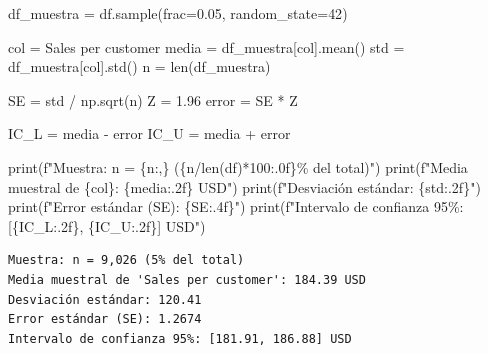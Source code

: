 \documentclass[
  letterpaper,
  DIV=11,
  numbers=noendperiod]{scrartcl}
\newenvironment{Shaded}{\begin{snugshade}}{\end{snugshade}}
\newcommand{\BuiltInTok}[1]{\textcolor[rgb]{0.00,0.23,0.31}{#1}}
\newcommand{\DecValTok}[1]{\textcolor[rgb]{0.68,0.00,0.00}{#1}}
\newcommand{\FloatTok}[1]{\textcolor[rgb]{0.68,0.00,0.00}{#1}}
\newcommand{\NormalTok}[1]{\textcolor[rgb]{0.00,0.23,0.31}{#1}}
\newcommand{\OperatorTok}[1]{\textcolor[rgb]{0.37,0.37,0.37}{#1}}
\newcommand{\SpecialCharTok}[1]{\textcolor[rgb]{0.37,0.37,0.37}{#1}}
\newcommand{\SpecialStringTok}[1]{\textcolor[rgb]{0.13,0.47,0.30}{#1}}
\newcommand{\StringTok}[1]{\textcolor[rgb]{0.13,0.47,0.30}{#1}}
\begin{document}
\protect{}\label{sampling-ci}
\begin{Shaded}
\begin{Highlighting}[]
\NormalTok{df\_muestra }\OperatorTok{=}\NormalTok{ df.sample(frac}\OperatorTok{=}\FloatTok{0.05}\NormalTok{, random\_state}\OperatorTok{=}\DecValTok{42}\NormalTok{)}

\NormalTok{col }\OperatorTok{=} \StringTok{\textquotesingle{}Sales per customer\textquotesingle{}}
\NormalTok{media }\OperatorTok{=}\NormalTok{ df\_muestra[col].mean()}
\NormalTok{std   }\OperatorTok{=}\NormalTok{ df\_muestra[col].std()}
\NormalTok{n     }\OperatorTok{=} \BuiltInTok{len}\NormalTok{(df\_muestra)}

\NormalTok{SE    }\OperatorTok{=}\NormalTok{ std }\OperatorTok{/}\NormalTok{ np.sqrt(n)}
\NormalTok{Z     }\OperatorTok{=} \FloatTok{1.96}
\NormalTok{error }\OperatorTok{=}\NormalTok{ SE }\OperatorTok{*}\NormalTok{ Z}

\NormalTok{IC\_L }\OperatorTok{=}\NormalTok{ media }\OperatorTok{{-}}\NormalTok{ error}
\NormalTok{IC\_U }\OperatorTok{=}\NormalTok{ media }\OperatorTok{+}\NormalTok{ error}

\BuiltInTok{print}\NormalTok{(}\SpecialStringTok{f"Muestra: n = }\SpecialCharTok{\{}\NormalTok{n}\SpecialCharTok{:,\}}\SpecialStringTok{ (}\SpecialCharTok{\{}\NormalTok{n}\OperatorTok{/}\BuiltInTok{len}\NormalTok{(df)}\OperatorTok{*}\DecValTok{100}\SpecialCharTok{:.0f\}}\SpecialStringTok{\% del total)"}\NormalTok{)}
\BuiltInTok{print}\NormalTok{(}\SpecialStringTok{f"Media muestral de \textquotesingle{}}\SpecialCharTok{\{}\NormalTok{col}\SpecialCharTok{\}}\SpecialStringTok{\textquotesingle{}: }\SpecialCharTok{\{}\NormalTok{media}\SpecialCharTok{:.2f\}}\SpecialStringTok{ USD"}\NormalTok{)}
\BuiltInTok{print}\NormalTok{(}\SpecialStringTok{f"Desviación estándar: }\SpecialCharTok{\{}\NormalTok{std}\SpecialCharTok{:.2f\}}\SpecialStringTok{"}\NormalTok{)}
\BuiltInTok{print}\NormalTok{(}\SpecialStringTok{f"Error estándar (SE): }\SpecialCharTok{\{}\NormalTok{SE}\SpecialCharTok{:.4f\}}\SpecialStringTok{"}\NormalTok{)}
\BuiltInTok{print}\NormalTok{(}\SpecialStringTok{f"Intervalo de confianza 95\%: [}\SpecialCharTok{\{}\NormalTok{IC\_L}\SpecialCharTok{:.2f\}}\SpecialStringTok{, }\SpecialCharTok{\{}\NormalTok{IC\_U}\SpecialCharTok{:.2f\}}\SpecialStringTok{] USD"}\NormalTok{)}
\end{Highlighting}
\end{Shaded}

\begin{verbatim}
Muestra: n = 9,026 (5% del total)
Media muestral de 'Sales per customer': 184.39 USD
Desviación estándar: 120.41
Error estándar (SE): 1.2674
Intervalo de confianza 95%: [181.91, 186.88] USD
\end{verbatim}
\end{document}

